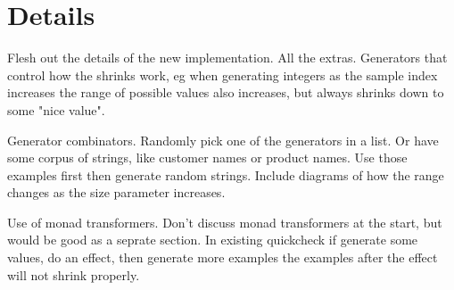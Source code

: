 \section{Details}

Flesh out the details of the new implementation. All the extras. Generators that control how the shrinks work, eg when generating integers as the sample index increases the range of possible values also increases, but always shrinks down to some "nice value".

Generator combinators. Randomly pick one of the generators in a list. Or have some corpus of strings, like customer names or product names. Use those examples first then generate random strings. Include diagrams of how the range changes as the size parameter increases.

Use of monad transformers. Don't discuss monad transformers at the start, but would be good as a seprate section. In existing quickcheck if generate some values, do an effect, then generate more examples the examples after the effect will not shrink properly.

